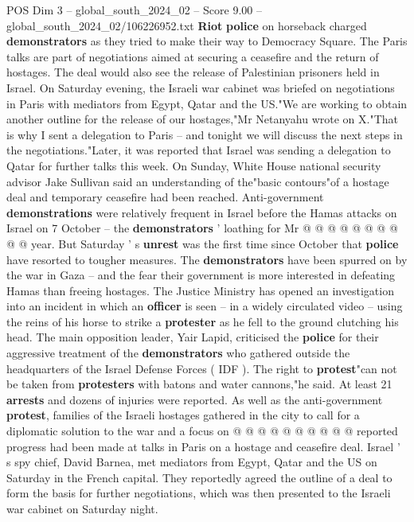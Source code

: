 \begin{textsample}{POS Dim 3 – global\_south\_2024\_02 – Score 9.00 – global\_south\_2024\_02/106226952.txt}  \label{ex:f3_pos_361}
\textbf{Riot} \textbf{police} on horseback charged \textbf{demonstrators} as they tried to make their way to Democracy Square.
The Paris talks are part of negotiations aimed at securing a ceasefire and the return of hostages.
The deal would also see the release of Palestinian prisoners held in Israel.
On Saturday evening, the Israeli war cabinet was briefed on negotiations in Paris with mediators from Egypt, Qatar and the US."We are working to obtain another outline for the release of our hostages,"Mr Netanyahu wrote on X."That is why I sent a delegation to Paris -- and tonight we will discuss the next steps in the negotiations."Later, it was reported that Israel was sending a delegation to Qatar for further talks this week.
On Sunday, White House national security advisor Jake Sullivan said an understanding of the"basic contours"of a hostage deal and temporary ceasefire had been reached.
Anti-government \textbf{demonstrations} were relatively frequent in Israel before the Hamas attacks on Israel on 7 October -- the \textbf{demonstrators} ' loathing for Mr @ @ @ @ @ @ @ @ @ @ year.
But Saturday ' s \textbf{unrest} was the first time since October that \textbf{police} have resorted to tougher measures.
The \textbf{demonstrators} have been spurred on by the war in Gaza -- and the fear their government is more interested in defeating Hamas than freeing hostages.
The Justice Ministry has opened an investigation into an incident in which an \textbf{officer} is seen -- in a widely circulated video -- using the reins of his horse to strike a \textbf{protester} as he fell to the ground clutching his head.
The main opposition leader, Yair Lapid, criticised the \textbf{police} for their aggressive treatment of the \textbf{demonstrators} who gathered outside the headquarters of the Israel Defense Forces ( IDF ).
The right to \textbf{protest}"can not be taken from \textbf{protesters} with batons and water cannons,"he said.
At least 21 \textbf{arrests} and dozens of injuries were reported.
As well as the anti-government \textbf{protest}, families of the Israeli hostages gathered in the city to call for a diplomatic solution to the war and a focus on @ @ @ @ @ @ @ @ @ @ reported progress had been made at talks in Paris on a hostage and ceasefire deal.
Israel ' s spy chief, David Barnea, met mediators from Egypt, Qatar and the US on Saturday in the French capital.
They reportedly agreed the outline of a deal to form the basis for further negotiations, which was then presented to the Israeli war cabinet on Saturday night.

\end{textsample}
